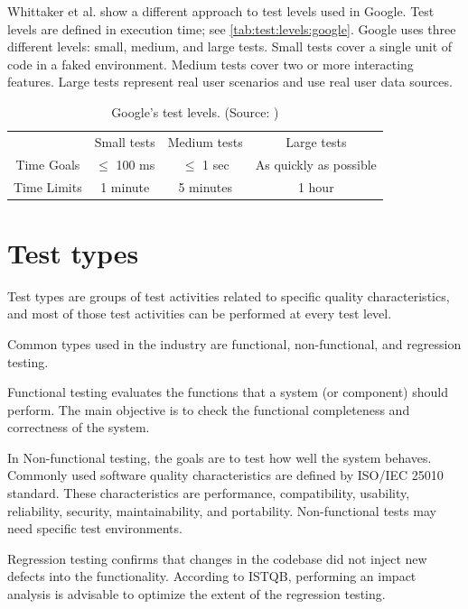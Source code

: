 Whittaker et al. show \cite{google:2012} a different approach to test levels used
in Google.
Test levels are defined in execution time; see \autoref{tab:test:levels:google}.
Google uses three different levels: small, medium, and large tests.
Small tests cover a single unit of code in a faked environment.
Medium tests cover two or more interacting features.
Large tests represent real user scenarios and use real user data sources.

\begin{table}
    \centering
    \begin{tabular}{|c c c c|}
        \hline
                    & Small tests   & Medium tests & Large tests            \\
        Time Goals  & $\leq$ 100 ms & $\leq$ 1 sec & As quickly as possible \\
        Time Limits & 1 minute      & 5 minutes    & 1 hour                 \\
        \hline
    \end{tabular}
    \caption{Google's test levels. (Source: \cite{google:2012})}
    \label{tab:test:levels:google}
\end{table}

\section{Test types}
Test types are groups of test activities related to specific quality characteristics, and most of those test activities can be performed at every test level. \cite{ctfl_syllabus:2023}

Common types used in the industry are functional, non-functional, and regression testing.

Functional testing evaluates the functions that a system (or component) should perform. The main objective is to check the functional completeness and correctness of the system.

In Non-functional testing, the goals are to test how well the system behaves. Commonly used software quality characteristics are defined by ISO/IEC 25010 standard\cite{iso_25010:2011}. These characteristics are performance, compatibility, usability, reliability, security, maintainability, and portability. Non-functional tests may need specific test environments.

Regression testing confirms that changes in the codebase did not inject new defects into the functionality. According to ISTQB, performing an impact analysis is advisable to optimize the extent of the regression testing.

